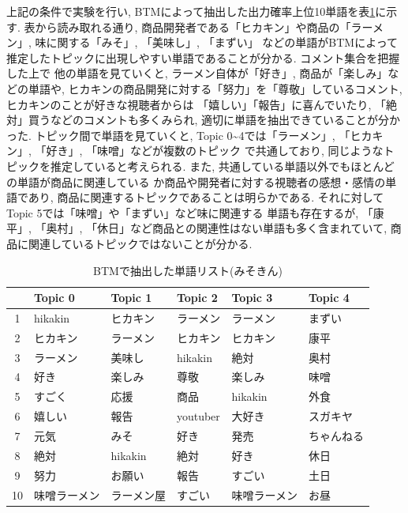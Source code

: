 \documentclass{ltjarticle}
\begin{document}
\newpage
上記の条件で実験を行い, BTMによって抽出した出力確率上位10単語を表\ref{table:みそきん単語結果}に示す. 
表から読み取れる通り, 商品開発者である「ヒカキン」や商品の「ラーメン」, 味に関する「みそ」, 「美味し」, 「まずい」
などの単語がBTMによって推定したトピックに出現しやすい単語であることが分かる. コメント集合を把握した上で
他の単語を見ていくと, ラーメン自体が「好き」, 商品が「楽しみ」などの単語や, 
ヒカキンの商品開発に対する「努力」を「尊敬」しているコメント, ヒカキンのことが好きな視聴者からは
「嬉しい」「報告」に喜んでいたり, 「絶対」買うなどのコメントも多くみられ, 適切に単語を抽出できていることが分かった. 
トピック間で単語を見ていくと, Topic 0\sim 4では「ラーメン」, 「ヒカキン」, 「好き」, 「味噌」などが複数のトピック
で共通しており, 同じようなトピックを推定していると考えられる. また, 共通している単語以外でもほとんどの単語が商品に関連している
か商品や開発者に対する視聴者の感想・感情の単語であり, 商品に関連するトピックであることは明らかである. 
それに対してTopic 5では「味噌」や「まずい」など味に関連する
単語も存在するが, 「康平」, 「奥村」, 「休日」など商品との関連性はない単語も多く含まれていて, 
商品に関連しているトピックではないことが分かる. 
\vspace{10truept}

\begin{table}[h]
    \caption{BTMで抽出した単語リスト(みそきん)}
    \vspace{5truept}

    \centering
    \begin{tabular}{|c|>{\centering}p{6em}|>{\centering}p{6em}|>{\centering}p{6em}|>{\centering}p{6em}|>{\centering\arraybackslash}p{6em}|}
        \hline
        & Topic 0 & Topic 1 & Topic 2 & Topic 3 & Topic 4\\
        \hline\hline
        1 & hikakin & ヒカキン & ラーメン & ラーメン & まずい\\
        \hline
        2 & ヒカキン & ラーメン & ヒカキン & ヒカキン & 康平\\
        \hline
        3 & ラーメン & 美味し & hikakin & 絶対 & 奥村\\
        \hline
        4 & 好き & 楽しみ & 尊敬 & 楽しみ & 味噌\\
        \hline
        5 & すごく & 応援 & 商品 & hikakin & 外食\\
        \hline
        6 & 嬉しい & 報告 & youtuber & 大好き & スガキヤ\\
        \hline
        7 & 元気 & みそ & 好き & 発売 & ちゃんねる\\
        \hline
        8 & 絶対 & hikakin & 絶対 & 好き & 休日\\
        \hline
        9 & 努力 & お願い & 報告 & すごい & 土日\\
        \hline
        10 & 味噌ラーメン & ラーメン屋 & すごい & 味噌ラーメン & お昼\\
        \hline
    \end{tabular}
    \label{table:みそきん単語結果}
\end{table}
\vspace{15truept}
\end{document}
